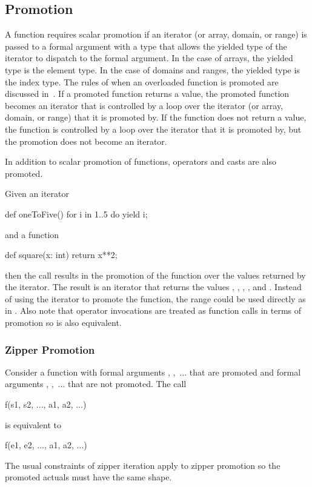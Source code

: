 \subsection{Promotion}
\label{Promotion}

A function requires scalar promotion if an iterator (or array, domain,
or range) is passed to a formal argument with a type that allows the
yielded type of the iterator to dispatch to the formal argument.  In
the case of arrays, the yielded type is the element type.  In the case
of domains and ranges, the yielded type is the index type.  The rules
of when an overloaded function is promoted are discussed
in~.  If a promoted function returns a
value, the promoted function becomes an iterator that is controlled by
a loop over the iterator (or array, domain, or range) that it is
promoted by.  If the function does not return a value, the function is
controlled by a loop over the iterator that it is promoted by, but the
promotion does not become an iterator.

In addition to scalar promotion of functions, operators and casts are
also promoted.

\begin{example}
Given an iterator
\begin{chapel}
def oneToFive() {
  for i in 1..5 do
    yield i;
}
\end{chapel}
and a function
\begin{chapel}
def square(x: int) return x**2;
\end{chapel}
then the call  results in the promotion of
the  function over the values returned by
the  iterator.  The result is an iterator that returns
the values , , , , and .
Instead of using the  iterator to promote
the  function, the range  could be used
directly as in .  Also note that operator
invocations are treated as function calls in terms of promotion
so  is also equivalent.
\end{example}

\subsubsection{Zipper Promotion}
\label{Zipper_Promotion}

Consider a function  with formal
arguments , ,~... that are promoted and formal
arguments , ,~... that are not promoted.  The call
\begin{chapel}
f(s1, s2, ..., a1, a2, ...)
\end{chapel}
is equivalent to
\begin{chapel}
[(e1, e2, ...) in (s1, s2, ...)] f(e1, e2, ..., a1, a2, ...)
\end{chapel}
The usual constraints of zipper iteration apply to zipper promotion so
the promoted actuals must have the same shape.

